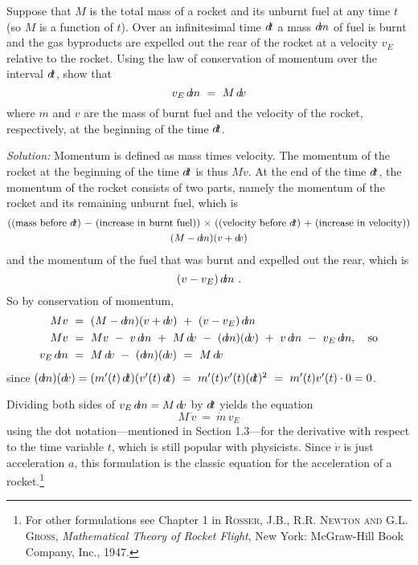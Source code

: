 \begin{exmp}\label{exmp:diff2}
\noindent Suppose that $M$ is the total mass of a rocket and its unburnt fuel
at any time $t$ (so $M$ is a function of $t$). Over an infinitesimal time $d\!t$
a mass $d\!m$ of fuel is burnt and the gas byproducts are expelled out the rear
of the rocket at a velocity $v_E$ relative to the rocket. Using the law of
conservation of momentum over the interval $d\!t$, show that
\[
 v_E\,d\!m ~=~ M\,d\!v
\]
where $m$ and $v$ are the mass of burnt fuel and the velocity of the rocket,
respectively, at the beginning of the time $d\!t$.\vspace{1mm}
\par\noindent\emph{Solution:} Momentum is defined as mass times velocity.
The momentum of the rocket at the beginning of the time $d\!t$ is thus $Mv$.
At the end of the time $d\!t$, the momentum of the rocket consists of two parts,
namely the momentum of the rocket and its remaining unburnt fuel, which is
\begin{gather}
\text{((mass before $d\!t$) $-$ (increase in burnt fuel)) $\times$
((velocity before $d\!t$) $+$ (increase in velocity))}\\
(M - d\!m)(v + d\!v)
\end{gather}
and the momentum of the fuel that was burnt and expelled out the rear, which is
\[
(v - v_E)\,d\!m ~.
\]
So by conservation of momentum,
\begin{align*}
Mv ~&=~ (M - \dm)(v + \dv) ~+~ (v - v_E)\,\dm\\
Mv ~&=~ Mv ~-~ v\,\dm ~+~ M\,\dv ~-~ (\dm)(\dv) ~+~ v\,\dm ~-~ v_E\,\dm, \quad\text{so}\\
 v_E\,\dm ~&=~ M\,\dv ~-~ (\dm)(\dv) ~=~ M\,\dv
\end{align*}
since $(d\!m)(d\!v) = (m'(t)\,d\!t)(v'(t)\,d\!t) ~=~ m'(t)v'(t)(d\!t)^2 
~=~ m'(t)v'(t) \cdot 0 = 0$.\vspace{2mm}

\noindent Dividing both sides of $v_E\,d\!m = M\,d\!v$ by $d\!t$ yields the equation
\[
M\,\dot{v} ~=~ \dot{m}\,v_E
\]
using the dot notation---mentioned in Section 1.3---for the derivative with
respect to the time variable $t$, which is still popular with physicists. Since
$\dot{v}$ is just acceleration $a$, this formulation is the classic equation for
the acceleration of a rocket.\footnote{For other formulations see Chapter 1 in
\textsc{Rosser, J.B., R.R. Newton and G.L. Gross}, \emph{Mathematical Theory of
Rocket Flight}, New York: McGraw-Hill Book Company, Inc., 1947.}
\end{exmp}
\divider
\vspace{3mm}

